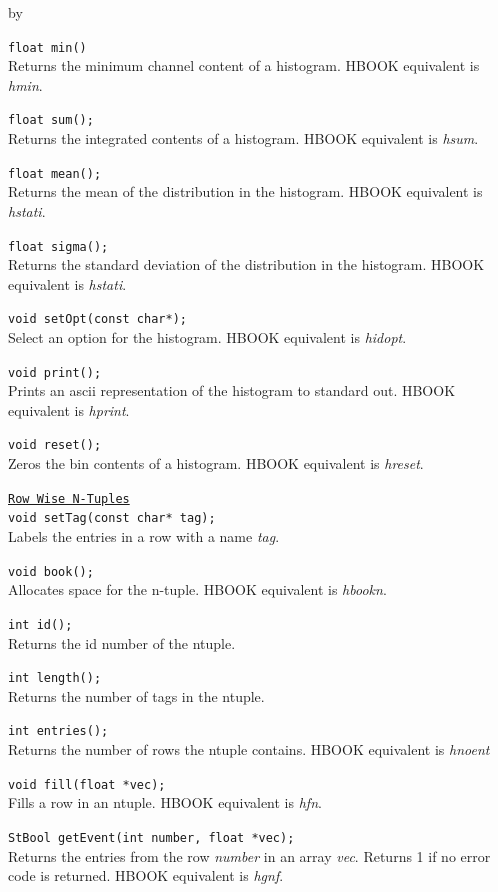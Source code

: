 \documentclass[twoside]{article}
\newcommand{\comp}[1]{\texttt{#1}}%
\newcommand{\entrylabel}[1]{\mbox{\textbf{{#1}}}\hfil}%
\newenvironment{entry}
{\begin{list}{}%
    {\renewcommand{\makelabel}{\entrylabel}%
     \setlength{\labelwidth}{90pt}%
     \setlength{\leftmargin}{\labelwidth}
     \advance\leftmargin by \labelsep%
      }%
    }%
  {\end{list}}
\newcommand{\Entrylabel}[1]%
{\raisebox{0pt}[1ex][0pt]{\makebox[\labelwidth][l]%
    {\parbox[t]{\labelwidth}{\hspace{0pt}\textbf{{#1}}}}}}
\newenvironment{Entry}%
{\renewcommand{\entrylabel}{\Entrylabel}\begin{entry}}%
  {\end{entry}}
\begin{document}
\begin{description}
\begin{Entry}
  \verb+float min()+\\
  Returns the minimum channel content of a histogram.  HBOOK equivalent
  is {\em hmin}.
  
  \verb+float sum();+\\
  Returns the integrated contents of a histogram.  HBOOK equivalent
  is {\em hsum}.

  \verb+float mean();+\\
  Returns the mean of the distribution in the histogram.
  HBOOK equivalent is {\em hstati}.
  
  \verb+float sigma();+\\
  Returns the standard deviation of the distribution in the histogram.
  HBOOK equivalent is {\em hstati}.
  
  \verb+void setOpt(const char*);+\\
  Select an option for the histogram.  HBOOK equivalent is {\em hidopt}.
  
  \verb+void print();+\\
  Prints an ascii representation of the histogram to standard out.
  HBOOK equivalent is {\em hprint}.
  
  \verb+void reset();+\\
  Zeros the bin contents of a histogram.  HBOOK equivalent is {\em hreset}.

  \comp{\underline{Row Wise N-Tuples}}\\
  \verb+void setTag(const char* tag);+\\
  Labels the entries in a row with a name {\em tag}.
  
  \verb+void book();+\\
  Allocates space for the n-tuple.  HBOOK equivalent is {\em hbookn}.
  
  \verb+int id();+\\
  Returns the id number of the ntuple.

  \verb+int length();+\\
  Returns the number of tags in the ntuple.
  
  \verb+int entries();+\\
  Returns the number of rows the ntuple contains.  HBOOK equivalent
  is {\em hnoent}
  
  \verb+void fill(float *vec);+\\
  Fills a row in an ntuple.  HBOOK equivalent is {\em hfn}.
  
  \verb+StBool getEvent(int number, float *vec);+\\
  Returns the entries from the row {\em number} in an array {\em vec}.
  Returns 1 if no error code is returned.
  HBOOK equivalent is {\em hgnf}.


\end{Entry}
\end{description}
\end{document}

